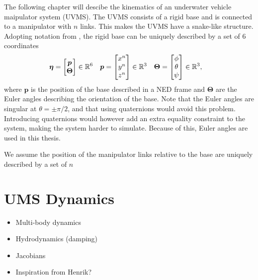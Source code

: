 The following chapter will descibe the kinematics of an underwater vehicle
maipulator system (UVMS). The UVMS consists of a rigid base and is connected to
a manipulator with $n$ links. This makes the UVMS have a snake-like structure.
Adopting notation from \cite{fossen2021}, the rigid base can be uniquely described
by a set of $6$ coordinates
\begin{align}
    \bm{\eta} &= \begin{bmatrix} \bm{p} \\ \bm{\Theta} \end{bmatrix} \in \mathbb{R}^6 &
        \bm{p} &= \begin{bmatrix} x^n \\ y^n \\ z^n \end{bmatrix} \in \mathbb{R}^3 &
    \bm{\Theta} &= \begin{bmatrix} \phi \\ \theta \\ \psi \end{bmatrix} \in \mathbb{R}^3,
\end{align}
where $\bm{p}$ is the position of the base described in a NED frame and $\bm{\Theta}$
are the Euler angles describing the orientation of the base. Note that the Euler
angles are singular at $\theta = \pm \pi/2$, and that using quaternions
would avoid this problem. Introducing quaternions would however add an extra
equality constraint to the system, making the system harder to simulate. Because
of this, Euler angles are used in this thesis. 

We assume the position of the manipulator links relative to the base are uniquely
described by a set of $n$


\section{UMS Dynamics}




{
    \color{red}
    \begin{itemize}
        \item Multi-body dynamics
        \item Hydrodynamics (damping)
        \item Jacobians
        \item Inspiration from Henrik?
    \end{itemize}
}
\fi
